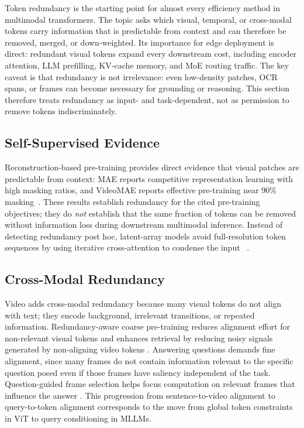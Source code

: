 \documentclass[10pt]{article}
\newenvironment{reviewchange}{\begingroup\color{red}}{\endgroup}
\begin{document}
Token redundancy is the starting point for almost every efficiency method in
multimodal transformers.  The topic asks which visual, temporal, or cross-modal tokens
carry information that is predictable from context and can therefore be removed,
merged, or down-weighted.  Its importance for edge deployment is direct: redundant
visual tokens expand every downstream cost, including encoder attention, LLM prefilling,
KV-cache memory, and MoE routing traffic.  The key caveat is that redundancy is not
irrelevance: even low-density patches, OCR spans, or frames can become necessary for
grounding or reasoning.  This section therefore treats redundancy as input- and
task-dependent, not as permission to remove tokens indiscriminately.

\begin{reviewchange}
\subsection{Self-Supervised Evidence}

Reconstruction-based pre-training provides direct evidence that visual
patches are predictable from context: MAE reports competitive representation learning
with high masking ratios, and VideoMAE reports effective pre-training near $90\%$
masking~\citep{he2021maskedautoencodersscalablevision,tong2022videomaemaskedautoencodersdataefficient}.
These results establish redundancy for the cited pre-training objectives; they do
\emph{not} establish that the same fraction of tokens can be removed without
information loss during downstream multimodal inference.
Instead of detecting redundancy post hoc, latent-array models avoid full-resolution
token sequences by using iterative cross-attention to condense the input
~\citep{jaegle2021perceivergeneralperceptioniterative}.

\end{reviewchange}

\subsection{Cross-Modal Redundancy}

Video adds cross-modal redundancy because many visual tokens do not align with text;
they encode background, irrelevant transitions, or repeated information.  Redundancy-aware
coarse pre-training reduces alignment
effort for non-relevant visual tokens and enhances retrieval by reducing noisy signals
generated by non-aligning video tokens \citep{wu2022rapredundancyawarevideolanguagepretraining}.
Answering questions demands fine alignment, since many frames do not contain information
relevant to the specific question posed even if those frames have saliency independent
of the task. Question-guided frame selection helps focus computation on relevant frames
that influence the answer \citep{Li_2023}.
This progression from sentence-to-video alignment to query-to-token alignment corresponds
to the move from global token constraints in ViT to query conditioning in MLLMs.
\end{document}
